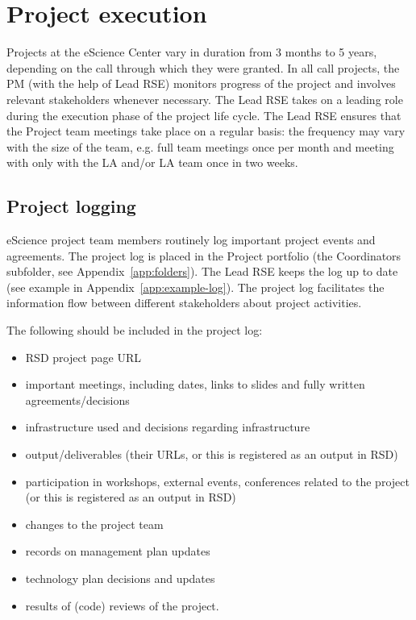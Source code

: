 \section{Project execution}
Projects at the eScience Center vary in duration from 3 months to 5 years, depending on the call through which they were
granted. In all call projects, the PM (with the help of Lead RSE) monitors progress of the project and involves
relevant stakeholders whenever necessary. The Lead RSE takes on a leading role during the execution phase of the
project life cycle. The Lead RSE ensures that the Project team meetings take place on a regular basis: the frequency
may vary with the size of the team, e.g. full team meetings once per month and meeting with only with the LA and/or LA
team once in two weeks.

\subsection{Project logging}
\label{sec:exec:log}
eScience project team members routinely log important project events and agreements. The project log is placed in the
Project portfolio (the Coordinators subfolder, see Appendix~\ref{app:folders}). The Lead RSE keeps the log up to
date (see example in Appendix~\ref{app:example-log}). The project log facilitates the information flow between
different stakeholders about project activities.

The following should be included in the project log:
\begin{itemize}[itemsep=-4pt,parsep=4pt]
\item RSD project page URL
\item important meetings, including dates, links to slides and fully written agreements/decisions
\item infrastructure used and decisions regarding infrastructure
\item output/deliverables (their URLs, or this is registered as an output in RSD)
\item participation in workshops, external events, conferences related to the project (or this is registered as an output in
RSD)
\item changes to the project team
\item records on management plan updates
\item technology plan decisions and updates
\item results of (code) reviews of the project.
\end{itemize}

